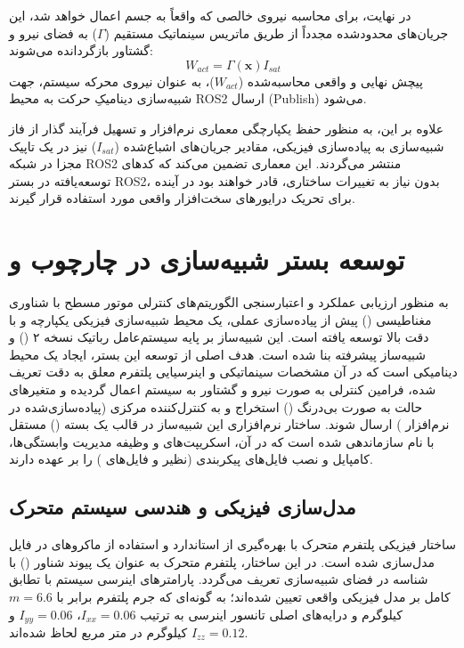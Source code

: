 	در نهایت، برای محاسبه نیروی خالصی که واقعاً به جسم اعمال خواهد شد، این جریان‌های محدودشده مجدداً از طریق ماتریس سینماتیک مستقیم ($\Gamma$) به فضای نیرو و گشتاور بازگردانده می‌شوند:
	\begin{equation}
		W_{act} = \Gamma(\mathbf{x}) I_{sat}
		\label{eq:method-actual-wrench}
	\end{equation}
	پیچش نهایی و واقعی محاسبه‌شده ($W_{act}$)، به عنوان نیروی محرکه سیستم، جهت شبیه‌سازی دینامیکِ حرکت به محیط ROS2 ارسال (Publish) می‌شود. 
	
	علاوه بر این، به منظور حفظ یکپارچگی معماری نرم‌افزار و تسهیل فرآیند گذار از فاز شبیه‌سازی به پیاده‌سازی فیزیکی، مقادیر جریان‌های اشباع‌شده ($I_{sat}$) نیز در یک تاپیک مجزا در شبکه ROS2 منتشر می‌گردند. این معماری تضمین می‌کند که کدهای توسعه‌یافته در بستر ROS2، بدون نیاز به تغییرات ساختاری، قادر خواهند بود در آینده برای تحریک درایورهای سخت‌افزار واقعی مورد استفاده قرار گیرند.
	
	
	\section{توسعه بستر شبیه‌سازی در چارچوب  و }
	\label{sec:method-sim-env}
	
	به منظور ارزیابی عملکرد و اعتبارسنجی الگوریتم‌های کنترلی موتور مسطح با شناوری مغناطیسی () پیش از پیاده‌سازی عملی، یک محیط شبیه‌سازی فیزیکی یکپارچه و با دقت بالا توسعه یافته است. این شبیه‌ساز بر پایه سیستم‌عامل رباتیک نسخه ۲ () و شبیه‌ساز پیشرفته  بنا شده است. هدف اصلی از توسعه این بستر، ایجاد یک محیط دینامیکی است که در آن مشخصات سینماتیکی و اینرسیایی پلتفرم معلق به دقت تعریف شده، فرامین کنترلی به صورت نیرو و گشتاور به سیستم اعمال گردیده و متغیرهای حالت به صورت بی‌درنگ () استخراج و به کنترل‌کننده مرکزی (پیاده‌سازی‌شده در نرم‌افزار ) ارسال شوند. ساختار نرم‌افزاری این شبیه‌ساز در قالب یک بسته () مستقل با نام  سازماندهی شده است که در آن، اسکریپت‌های  و  وظیفه مدیریت وابستگی‌ها، کامپایل و نصب فایل‌های پیکربندی (نظیر  و فایل‌های ) را بر عهده دارند.
	
	\subsection{مدل‌سازی فیزیکی و هندسی سیستم متحرک}
	\label{subsec:method-urdf-model}
	ساختار فیزیکی پلتفرم متحرک با بهره‌گیری از استاندارد  و استفاده از ماکروهای  در فایل  مدل‌سازی شده است. در این ساختار، پلتفرم متحرک به عنوان یک پیوند شناور () با شناسه  در فضای شبیه‌سازی تعریف می‌گردد. پارامترهای اینرسی سیستم با تطابق کامل بر مدل فیزیکی واقعی تعیین شده‌اند؛ به گونه‌ای که جرم پلتفرم برابر با $m = 6.6$ کیلوگرم و درایه‌های اصلی تانسور اینرسی به ترتیب $I_{xx} = 0.06$، $I_{yy} = 0.06$ و $I_{zz} = 0.12$ کیلوگرم در متر مربع لحاظ شده‌اند. 
	
